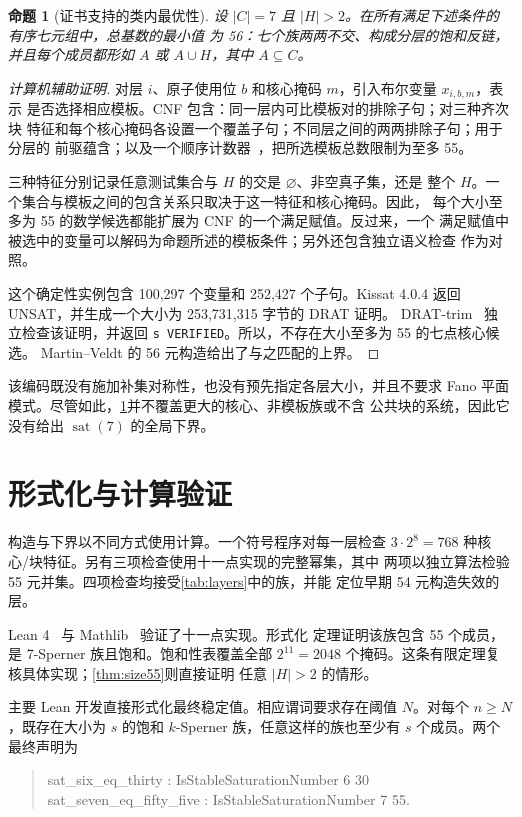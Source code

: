 \documentclass[UTF8,11pt,a4paper,fontset=fandol]{ctexart}
\newtheorem{proposition}[theorem]{命题}
\theoremstyle{definition}
\theoremstyle{remark}
\newcommand{\sat}{\operatorname{sat}}
\begin{document}
\begin{proposition}[证书支持的类内最优性]
\label{prop:class-optimum}
设 $|C|=7$ 且 $|H|>2$。在所有满足下述条件的有序七元组中，总基数的最小值
为 56：七个族两两不交、构成分层的饱和反链，并且每个成员都形如 $A$ 或
$A\cup H$，其中 $A\subseteq C$。
\end{proposition}

\begin{proof}[计算机辅助证明]
对层 $i$、原子使用位 $b$ 和核心掩码 $m$，引入布尔变量 $x_{i,b,m}$，表示
是否选择相应模板。CNF 包含：同一层内可比模板对的排除子句；对三种齐次块
特征和每个核心掩码各设置一个覆盖子句；不同层之间的两两排除子句；用于分层的
前驱蕴含；以及一个顺序计数器~\cite{sinz2005}，把所选模板总数限制为至多 55。

三种特征分别记录任意测试集合与 $H$ 的交是 $\varnothing$、非空真子集，还是
整个 $H$。一个集合与模板之间的包含关系只取决于这一特征和核心掩码。因此，
每个大小至多为 55 的数学候选都能扩展为 CNF 的一个满足赋值。反过来，一个
满足赋值中被选中的变量可以解码为命题所述的模板条件；另外还包含独立语义检查
作为对照。

这个确定性实例包含 100,297 个变量和 252,427 个子句。Kissat 4.0.4 返回
UNSAT，并生成一个大小为 253,731,315 字节的 DRAT 证明。
DRAT-trim~\cite{wetzler2014} 独立检查该证明，并返回
\texttt{s VERIFIED}。所以，不存在大小至多为 55 的七点核心候选。
Martin--Veldt 的 56 元构造给出了与之匹配的上界。
\end{proof}

该编码既没有施加补集对称性，也没有预先指定各层大小，并且不要求 Fano 平面
模式。尽管如此，\cref{prop:class-optimum}并不覆盖更大的核心、非模板族或不含
公共块的系统，因此它没有给出 $\sat(7)$ 的全局下界。

\section{形式化与计算验证}
\label{sec:verification}

构造与下界以不同方式使用计算。一个符号程序对每一层检查
$3\cdot2^8=768$ 种核心/块特征。另有三项检查使用十一点实现的完整幂集，其中
两项以独立算法检验 55 元并集。四项检查均接受\cref{tab:layers}中的族，并能
定位早期 54 元构造失效的层。

Lean 4~\cite{lean4} 与 Mathlib~\cite{mathlib2020} 验证了十一点实现。形式化
定理证明该族包含 55 个成员，是 7-Sperner 族且饱和。饱和性表覆盖全部
$2^{11}=2048$ 个掩码。这条有限定理复核具体实现；\cref{thm:size55}则直接证明
任意 $|H|>2$ 的情形。

主要 Lean 开发直接形式化最终稳定值。相应谓词要求存在阈值 $N$。对每个
$n\geq N$，既存在大小为 $s$ 的饱和 $k$-Sperner 族，任意这样的族也至少有
$s$ 个成员。两个最终声明为
\begin{quote}\small\ttfamily
sat\_six\_eq\_thirty : IsStableSaturationNumber 6 30\\
sat\_seven\_eq\_fifty\_five : IsStableSaturationNumber 7 55.
\end{quote}
\end{document}
